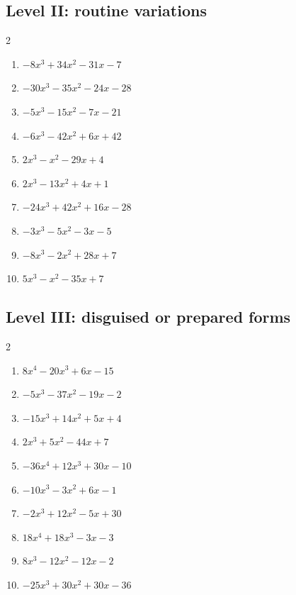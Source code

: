 \documentclass[11pt,oneside]{book}
\begin{document}
\subsection*{Level II: routine variations}
\begin{multicols}{2}
\begin{enumerate}[leftmargin=*,label=\textbf{\arabic*.},itemsep=0.65\baselineskip]
\item $ - 8 x^{3} + 34 x^{2} - 31 x - 7 $
\item $ - 30 x^{3} - 35 x^{2} - 24 x - 28 $
\item $ - 5 x^{3} - 15 x^{2} - 7 x - 21 $
\item $ - 6 x^{3} - 42 x^{2} + 6 x + 42 $
\item $ 2 x^{3} - x^{2} - 29 x + 4 $
\item $ 2 x^{3} - 13 x^{2} + 4 x + 1 $
\item $ - 24 x^{3} + 42 x^{2} + 16 x - 28 $
\item $ - 3 x^{3} - 5 x^{2} - 3 x - 5 $
\item $ - 8 x^{3} - 2 x^{2} + 28 x + 7 $
\item $ 5 x^{3} - x^{2} - 35 x + 7 $
\end{enumerate}
\end{multicols}
\subsection*{Level III: disguised or prepared forms}
\begin{multicols}{2}
\begin{enumerate}[leftmargin=*,label=\textbf{\arabic*.},itemsep=0.65\baselineskip]
\item $ 8 x^{4} - 20 x^{3} + 6 x - 15 $
\item $ - 5 x^{3} - 37 x^{2} - 19 x - 2 $
\item $ - 15 x^{3} + 14 x^{2} + 5 x + 4 $
\item $ 2 x^{3} + 5 x^{2} - 44 x + 7 $
\item $ - 36 x^{4} + 12 x^{3} + 30 x - 10 $
\item $ - 10 x^{3} - 3 x^{2} + 6 x - 1 $
\item $ - 2 x^{3} + 12 x^{2} - 5 x + 30 $
\item $ 18 x^{4} + 18 x^{3} - 3 x - 3 $
\item $ 8 x^{3} - 12 x^{2} - 12 x - 2 $
\item $ - 25 x^{3} + 30 x^{2} + 30 x - 36 $
\end{enumerate}
\end{multicols}
\end{document}
